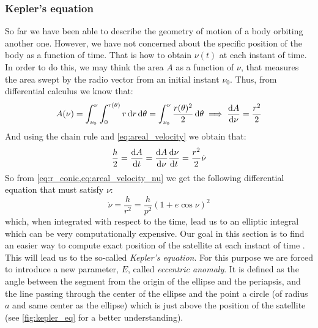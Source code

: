 \documentclass[../main.tex]{subfiles}
\begin{document}
\subsubsection{Kepler's equation}\label{sec:kepler_equation}
So far we have been able to describe the geometry of motion of a body orbiting another one. However, we have not concerned about the specific position of the body as a function of time. That is how to obtain $\nu(t)$ at each instant of time. In order to do this, we may think the area $A$ as a function of $\nu$, that measures the area swept by the radio vector from an initial instant $\nu_0$. Thus, from differential calculus we know that:
\begin{equation}
  A(\nu)=\int_{\nu_0}^{\nu}\int_{0}^{r(\theta)}r\dd{r}\dd{\theta}=\int_{\nu_0}^{\nu}\frac{r(\theta)^2}{2}\dd{\theta}\implies\dv{A}{\nu}=\frac{r^2}{2}
\end{equation}
And using the chain rule and \cref{eq:areal_velocity} we obtain that:
\begin{equation}\label{eq:areal_velocity_nu}
  \frac{h}{2}=\dv{A}{t}=\dv{A}{\nu}\dv{\nu}{t}=\frac{r^2}{2}\dot\nu
\end{equation}
So from \cref{eq:r_conic,eq:areal_velocity_nu} we get the following differential equation that must satisfy $\nu$:
\begin{equation}
  \dot\nu=\frac{h}{r^2}=\frac{h}{p^2}{(1+e\cos\nu)}^2
\end{equation}
which, when integrated with respect to the time, lead us to an elliptic integral which can be very computationally expensive. Our goal in this section is to find an easier way to compute exact position of the satellite at each instant of time \cite{montenbruck}. This will lead us to the so-called \emph{Kepler's equation}. For this purpose we are forced to introduce a new parameter, $E$, called \emph{eccentric anomaly}. It is defined as the angle between the segment from the origin of the ellipse and the periapsis, and the line passing through the center of the ellipse and the point a circle (of radius $a$ and same center as the ellipse) which is just above the position of the satellite (see \cref{fig:kepler_eq} for a better understanding).
\end{document}

